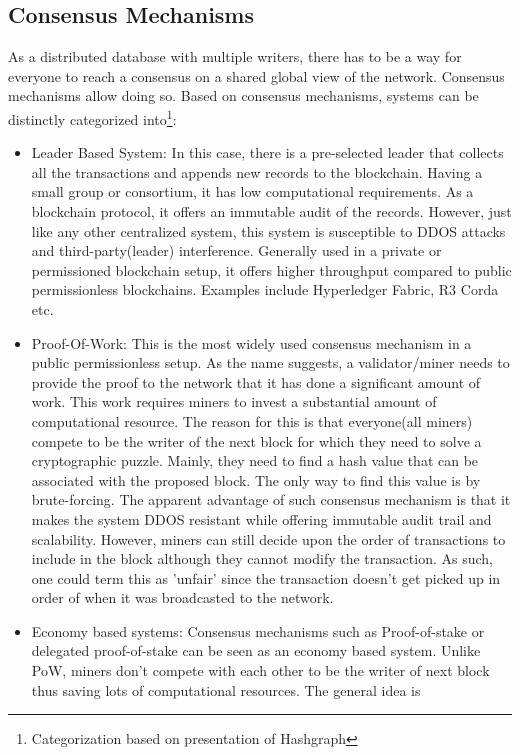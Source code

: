 \subsection{Consensus Mechanisms}
As a distributed database with multiple writers, there has to be a way for
everyone to reach a consensus on a shared global view of the network. Consensus
mechanisms allow doing so. Based on consensus mechanisms, systems can be
distinctly categorized into\footnote{Categorization based on presentation of Hashgraph}:
\begin{itemize}
	\item Leader Based System: In this case, there is a pre-selected leader
		that collects all the transactions and appends new records to the
		blockchain. Having a small group or consortium, it has low
		computational requirements. As a blockchain protocol, it offers an
		immutable audit of the records. However, just like any other
		centralized system, this system is susceptible to DDOS attacks and
		third-party(leader) interference. Generally used in a private or
		permissioned blockchain setup, it offers higher throughput compared to
		public permissionless blockchains. Examples include Hyperledger Fabric,
		R3 Corda etc. 
	\item Proof-Of-Work: This is the most widely used consensus mechanism in a
		public permissionless setup. As the name suggests, a validator/miner
		needs to provide the proof to the network that it has done a
		significant amount of work. This work requires miners to invest a
		substantial amount of computational resource. The reason for this is
		that everyone(all miners) compete to be the writer of the next block
		for which they need to solve a cryptographic puzzle. Mainly, they need
		to find a hash value that can be associated with the proposed block.
		The only way to find this value is by brute-forcing. The apparent
		advantage of such consensus mechanism is that it makes the system DDOS
		resistant while offering immutable audit trail and scalability.
		However, miners can still decide upon the order of transactions to
		include in the block although they cannot modify the transaction. As
		such, one could term this as 'unfair' since the transaction doesn't get
		picked up in order of when it was broadcasted to the network. 
	\item Economy based systems: Consensus mechanisms such as Proof-of-stake or
		delegated proof-of-stake can be seen as an economy based system. Unlike
		PoW, miners don't compete with each other to be the writer of next
		block thus saving lots of computational resources. The general idea is

\end{itemize}
